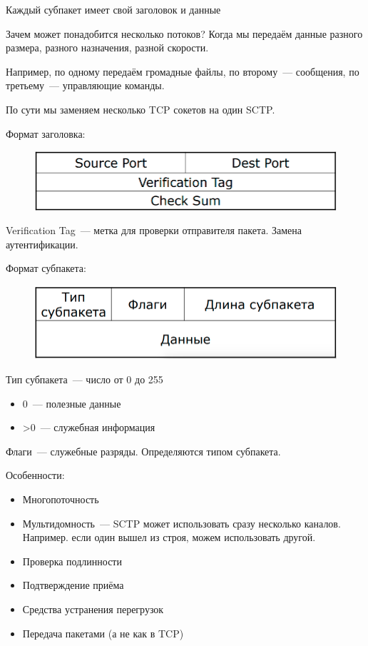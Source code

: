Каждый субпакет имеет свой заголовок и данные

Зачем может понадобится несколько потоков? Когда мы передаём данные разного размера, разного назначения, разной скорости.

Например, по одному передаём громадные файлы, по второму~--- сообщения, по третьему~--- управляющие команды.

По сути мы заменяем несколько TCP сокетов на один SCTP.

Формат заголовка:

\begin{figure}[H]
  \centering
  \includegraphics[width=15cm]{images/03/08}
\end{figure}

Verification Tag~--- метка для проверки отправителя пакета. Замена аутентификации.

Формат субпакета:

\begin{figure}[H]
  \centering
  \includegraphics[width=15cm]{images/03/09}
\end{figure}

Тип субпакета~--- число от 0 до 255
\begin{itemize}
    \item 0~--- полезные данные
    \item >0~--- служебная информация
\end{itemize}

Флаги~--- служебные разряды. Определяются типом субпакета.

Особенности:
\begin{itemize}
    \item Многопоточность
    \item Мультидомность~--- SCTP может использовать сразу несколько каналов. Например. если один вышел из строя, можем использовать другой.
    \item Проверка подлинности
    \item Подтверждение приёма
    \item Средства устранения перегрузок
    \item Передача пакетами (а не как в TCP)
\end{itemize}